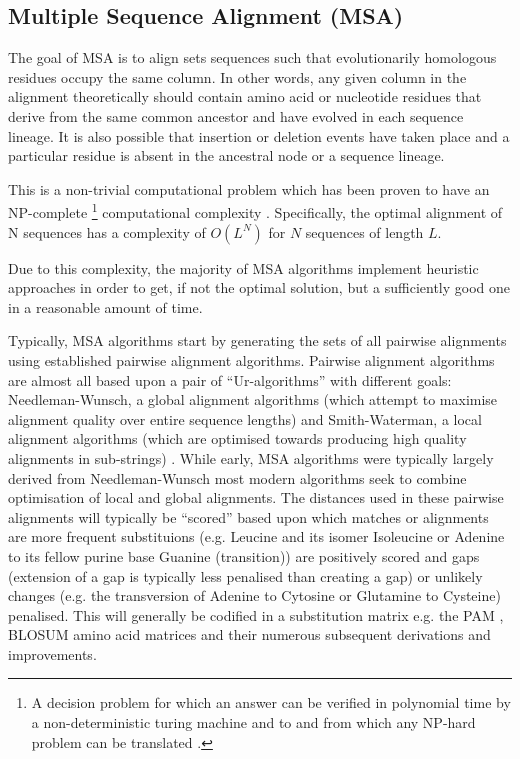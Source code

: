 \subsection{Multiple Sequence Alignment (MSA)}

The goal of MSA is to align sets sequences such that 
evolutionarily homologous residues occupy the same column. In other words,
any given column in the alignment theoretically should contain amino acid or nucleotide residues
that derive from the same common ancestor and have evolved in each sequence lineage.
It is also possible that insertion or deletion events have taken place
and a particular residue is absent in the ancestral node or a sequence lineage.

This is a non-trivial computational problem which has been proven to have an NP-complete
\footnote{A decision problem for which an answer can be verified in polynomial time 
    by a non-deterministic turing machine and to and from which any NP-hard problem
    can be translated \citep{Karp1972}.} computational complexity \citep{Wang1994}.
Specifically, the optimal alignment of N sequences has a complexity of \(O(L^{N})\)
for \(N\) sequences of length \( L \)\citep{Sievers2011}.

Due to this complexity, the majority of MSA algorithms implement heuristic approaches
in order to get, if not the optimal solution, but a sufficiently good one in a reasonable
amount of time. 

Typically, MSA algorithms start by generating the sets of all pairwise alignments
using established pairwise alignment algorithms.
Pairwise alignment algorithms are almost all based upon a
pair of ``Ur-algorithms'' with different goals: 
Needleman-Wunsch, a global alignment algorithms (which attempt to maximise 
alignment quality over entire sequence lengths) \citep{Needleman1970} and Smith-Waterman, 
a local alignment algorithms (which are optimised towards producing high quality alignments
in sub-strings) \citep{Smith1981}.  While early, MSA algorithms were typically
largely derived from Needleman-Wunsch most modern algorithms seek to combine 
optimisation of local and global alignments.  The distances used in these
pairwise alignments will typically be ``scored'' based upon which matches or 
alignments are more frequent substituions (e.g. Leucine and its isomer Isoleucine 
or Adenine to its fellow purine base Guanine (transition)) 
are positively scored and gaps (extension of a gap is typically
less penalised than creating a gap) or unlikely changes (e.g. the transversion
of Adenine to Cytosine or Glutamine to Cysteine) penalised.
This will generally be codified in a substitution matrix e.g. the PAM \citep{Dayhoff1978}, 
BLOSUM \citep{Henikoff1992} amino acid matrices and their numerous subsequent
derivations and improvements. 


